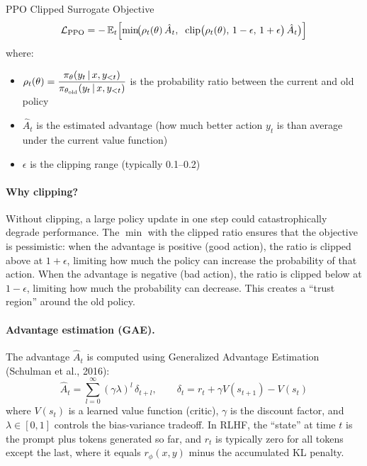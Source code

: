 \begin{mathresult}{PPO Clipped Surrogate Objective}
\begin{equation}
\mathcal{L}_{\text{PPO}} = -\operatorname{\mathbb{E}}_t \Bigl[
  \min\!\bigl(
    \rho_t(\theta)\, \hat{A}_t,\;\;
    \text{clip}\bigl(\rho_t(\theta),\, 1-\epsilon,\, 1+\epsilon\bigr)\, \hat{A}_t
  \bigr)
\Bigr]
\label{eq:ppo}
\end{equation}
where:
\begin{itemize}
\item $\rho_t(\theta) = \dfrac{\pi_\theta(y_t \,|\, x, y_{<t})}
  {\pi_{\theta_{\text{old}}}(y_t \,|\, x, y_{<t})}$ is the probability
  ratio between the current and old policy
\item $\hat{A}_t$ is the estimated advantage (how much better action $y_t$
  is than average under the current value function)
\item $\epsilon$ is the clipping range (typically 0.1--0.2)
\end{itemize}
\end{mathresult}

\paragraph{Why clipping?}
Without clipping, a large policy update in one step could catastrophically
degrade performance.  The $\min$ with the clipped ratio ensures that the
objective is pessimistic: when the advantage is positive (good action), the
ratio is clipped above at $1 + \epsilon$, limiting how much the policy can
increase the probability of that action.  When the advantage is negative
(bad action), the ratio is clipped below at $1 - \epsilon$, limiting how
much the probability can decrease.  This creates a ``trust region'' around
the old policy.

\paragraph{Advantage estimation (GAE).}
The advantage $\hat{A}_t$ is computed using Generalized Advantage Estimation
(Schulman et al., 2016):
\begin{equation}
\hat{A}_t = \sum_{l=0}^{\infty} (\gamma \lambda)^l \, \delta_{t+l},
\qquad
\delta_t = r_t + \gamma V(s_{t+1}) - V(s_t)
\end{equation}
where $V(s_t)$ is a learned value function (critic), $\gamma$ is the
discount factor, and $\lambda \in [0, 1]$ controls the bias-variance
tradeoff.  In RLHF, the ``state'' at time $t$ is the prompt plus tokens
generated so far, and $r_t$ is typically zero for all tokens except the
last, where it equals $r_\phi(x, y)$ minus the accumulated KL penalty.

